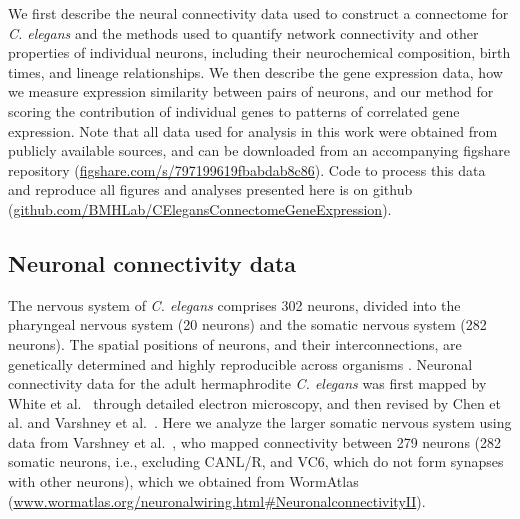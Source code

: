 \documentclass[10pt,letterpaper]{article}
\begin{document}
We first describe the neural connectivity data used to construct a connectome for \textit{C. elegans} and the methods used to quantify network connectivity and other properties of individual neurons, including their neurochemical composition, birth times, and lineage relationships.
We then describe the gene expression data, how we measure expression similarity between pairs of neurons, and our method for scoring the contribution of individual genes to patterns of correlated gene expression.
Note that all data used for analysis in this work were obtained from publicly available sources, and can be downloaded from an accompanying figshare repository (\url{figshare.com/s/797199619fbabdab8c86}).
Code to process this data and reproduce all figures and analyses presented here is on github (\url{github.com/BMHLab/CElegansConnectomeGeneExpression}).



\subsection*{Neuronal connectivity data}
The nervous system of \emph{C. elegans} comprises 302 neurons, divided into the pharyngeal nervous system (20 neurons) and the somatic nervous system (282 neurons).
The spatial positions of neurons, and their interconnections, are genetically determined and highly reproducible across organisms \cite{Riddle1997}.
Neuronal connectivity data for the adult hermaphrodite \emph{C. elegans} was first mapped by White et al.~\cite{White:1986tx} through detailed electron microscopy, and then revised by Chen et al. \cite{Chen:2006ie} and Varshney et al.~\cite{Varshney2011}.
Here we analyze the larger somatic nervous system using data from Varshney et al.~\cite{Varshney2011}, who mapped connectivity between 279 neurons (282 somatic neurons, i.e., excluding CANL/R, and VC6, which do not form synapses with other neurons), which we obtained from WormAtlas \cite{WormAtlas} (\url{www.wormatlas.org/neuronalwiring.html#NeuronalconnectivityII}).
\end{document}
